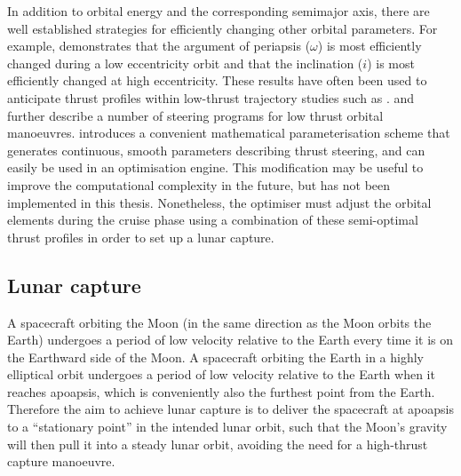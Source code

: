 In addition to orbital energy and the corresponding semimajor axis, there are well established strategies for efficiently changing other orbital parameters. For example, \textcite{Edelbaum1964} demonstrates that the argument of periapsis ($\omega$) is most efficiently changed during a low eccentricity orbit and that the inclination ($i$) is most efficiently changed at high eccentricity. These results have often been used to anticipate thrust profiles within low-thrust trajectory studies such as \textcite{Dachwald2007}. 
\textcite{Pollard2000} and \textcite{Herbiniere2000} further describe a number of steering programs for low thrust orbital manoeuvres. 
\textcite{Gao2008} introduces a convenient mathematical parameterisation scheme that generates continuous, smooth parameters describing thrust steering, and can easily be used in an optimisation engine. This modification may be useful to improve the computational complexity in the future, but has not been implemented in this thesis. Nonetheless, the optimiser must adjust the orbital elements during the cruise phase using a combination of these semi-optimal thrust profiles in order to set up a lunar capture.


\subsection{Lunar capture} \label{sub:Capture}

A spacecraft orbiting the Moon (in the same direction as the Moon orbits the Earth) undergoes a period of low velocity relative to the Earth every time it is on the Earthward side of the Moon. A spacecraft orbiting the Earth in a highly elliptical orbit undergoes a period of low velocity relative to the Earth when it reaches apoapsis, which is conveniently also the furthest point from the Earth. Therefore the aim to achieve lunar capture is to deliver the spacecraft at apoapsis to a \enquote{stationary point} in the intended lunar orbit, such that the Moon's gravity will then pull it into a steady lunar orbit, avoiding the need for a high-thrust capture manoeuvre.


